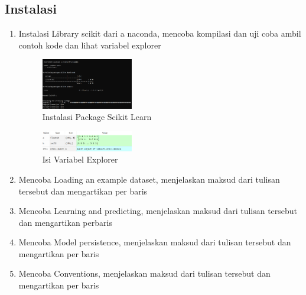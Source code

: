 \subsection{Instalasi}
\begin{enumerate}
	\item Instalasi Library scikit dari a naconda, mencoba kompilasi dan uji coba ambil contoh kode dan lihat variabel explorer
	\hfill\break
	\begin{figure}[H]
		\includegraphics[width=4cm]{figures/1174089/1/1.png}
		\centering
		\caption{Instalasi Package Scikit Learn}
	\end{figure}
	\begin{figure}[H]
		\includegraphics[width=4cm]{figures/1174089/1/2.png}
		\centering
		\caption{Isi Variabel Explorer}
	\end{figure}
	\item Mencoba Loading an example dataset, menjelaskan maksud dari tulisan tersebut dan mengartikan per baris
	\hfill\break
	
	\item Mencoba Learning and predicting, menjelaskan maksud dari tulisan tersebut dan mengartikan perbaris
	\hfill\break
	
	\item  Mencoba Model persistence, menjelaskan maksud dari tulisan tersebut dan mengartikan per baris
	\hfill\break
	
	\item Mencoba Conventions, menjelaskan maksud dari tulisan tersebut dan mengartikan per baris
	\hfill\break
	
\end{enumerate}

